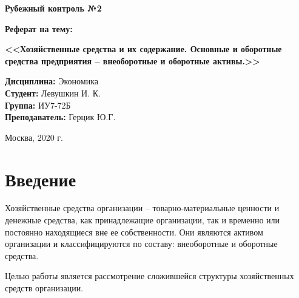 \documentclass[a4paper,14pt]{extarticle}
\begin{document}
 	\LARGE
 	\begin{center}
 		\textbf{Рубежный контроль №2}
 		
 		\textbf{Реферат на тему:}
 		
 		\textbf{<<Хозяйственные средства и их содержание. Основные и оборотные средства
 			предприятия – внеоборотные и оборотные активы.>>}
 	\end{center}
 	
 	
 	\vspace*{15mm}
 	
 	\large
 	\begin{flushleft}
 		\textbf{Дисциплина:} Экономика \\
 		\textbf{Студент:} Левушкин И. К. \\
 		\textbf{Группа:} ИУ7-72Б \\
 		\textbf{Преподаватель:} Герцик Ю.Г.\\
 	\end{flushleft}
 	
 	\vspace*{50mm}
 	
 	\large
 	\begin{center}
 		Москва, 2020 г.
 	\end{center}
 	
 	\thispagestyle{empty}
 	
 	\newpage
 	
 	\tableofcontents
 	\newpage
 	\section*{Введение}
 	
 	Хозяйственные средства организации – товарно-материальные ценности и денежные средства, как принадлежащие организации, так и временно или постоянно находящиеся вне ее собственности. Они являются активом организации и классифицируются по составу: внеоборотные и оборотные средства.
 	
 	Целью работы является рассмотрение сложившейся структуры
 	хозяйственных средств организации.
 	
\end{document}
